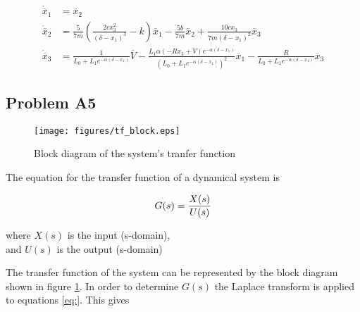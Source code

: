 \documentclass[a4paper,10pt,reqno]{amsart}
\numberwithin{equation}{section}
\begin{document}
\begin{subequations}
     \begin{align}
          \dot{\overline{x}}_1 &= \overline{x}_2 \\
          \dot{\overline{x}}_2 &= \frac{5}{7 m}\left(\frac{2 c x_{3}^{2}}{\left(\delta - x_{1}\right)^{3}} - k\right)\overline{x}_1  - \frac{5 b}{7 m}\overline{x}_2 + \frac{10 c x_{3}}{7 m \left(\delta - x_{1}\right)^{2}}\overline{x}_3\\
          \dot{\overline{x}}_3 &= \frac{1}{L_{0} + L_{1} e^{- \alpha \left(\delta - x_{1}\right)}}\overline{V} - \frac{L_{1} \alpha \left(- R x_{3} + V\right) e^{- \alpha \left(\delta - x_{1}\right)}}{\left(L_{0} + L_{1} e^{- \alpha \left(\delta - x_{1}\right)}\right)^{2}}\overline{x}_1 - \frac{R}{L_{0} + L_{1} e^{- \alpha \left(\delta - x_{1}\right)}}\overline{x}_3
     \end{align}
\end{subequations}

\subsection{Problem A5}\label{sec:a5}\hfill

\begin{figure}[H]
     \texttt{[image: figures/tf\_block.eps]}
     \caption{Block diagram of the system's tranfer function}
     \label{fig:tfBlock}
\end{figure}

The equation for the transfer function of a dynamical system is

\begin{equation}
     G(s) = \frac{X(s)}{U(s)} \label{eq:TF} \\
\end{equation}

\begin{center}
     where $X(s)$ is the input (s-domain), \\
     and $U(s)$ is the output (s-domain)
\end{center}
\vspace{10pt}

The transfer function of the system can be represented by the block diagram shown in figure \ref{fig:tfBlock}. In order to determine $G(s)$ the Laplace transform is applied to equations \ref{eq:}. This gives
\end{document}
